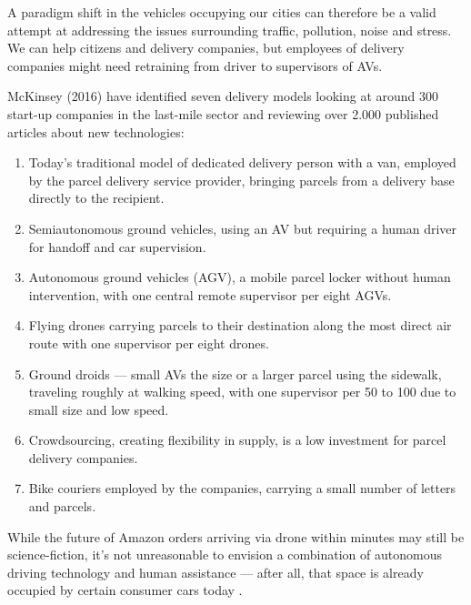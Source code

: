 \documentclass[12pt, usenames, dvipsnames]{report}
\begin{document}
\begin{flushleft}
A paradigm shift in the vehicles occupying our cities can therefore be a valid attempt at addressing the issues surrounding traffic, pollution, noise and stress.
We can help citizens and delivery companies, but employees of delivery companies might need retraining from driver to supervisors of AVs.

McKinsey (2016) \cite{mckinsey2016} have identified seven delivery models looking at around 300 start-up companies in the last-mile sector and reviewing over 2.000 published articles about new technologies: 

\begin{enumerate}
	\item Today's traditional model of dedicated delivery person with a van, employed by the parcel delivery service provider, bringing parcels from a delivery base directly to the recipient.
	\item Semiautonomous ground vehicles, using an AV but requiring a human driver for handoff and car supervision.
	\item Autonomous ground vehicles (AGV), a mobile parcel locker without human intervention, with one central remote supervisor per eight AGVs.
	\item Flying drones carrying parcels to their destination along the most direct air route with one supervisor per eight drones.
	\item Ground droids --- small AVs the size or a larger parcel using the sidewalk, traveling roughly at walking speed, with one supervisor per 50 to 100 due to small size and low speed.
	\item Crowdsourcing, creating flexibility in supply, is a low investment for parcel delivery companies.
	\item Bike couriers employed by the companies, carrying a small number of letters and parcels.
\end{enumerate}

While the future of Amazon orders arriving via drone within minutes may still be science-fiction, it's not unreasonable to envision a combination of autonomous driving technology and human assistance --- after all, that space is already occupied by certain consumer cars today \cite{mcfarland2020}.


\end{flushleft}
\end{document}
